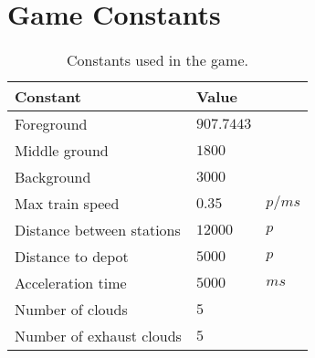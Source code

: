 \chapter{Game Constants}

\begin{table}[H]
\centering
\begin{tabular}{| l | l l |}
\hline
\textbf{Constant} & \textbf{Value} & \\
\hline
Foreground & $907.7443$ &\\
Middle ground & $1800$ &\\
Background & $3000$ &\\
Max train speed & $0.35$ & $p/ms$\\
Distance between stations & $12000$ & $p$\\
Distance to depot & $5000$ & $p$\\
Acceleration time & $5000$ & $ms$\\
Number of clouds & $5$ &\\
Number of exhaust clouds & $5$ &\\
\hline
\end{tabular}
\label{tab:constants}
\caption{Constants used in the game.}
\end{table}
